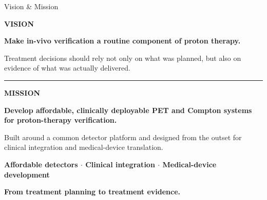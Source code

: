 \documentclass[aspectratio=169,11pt]{beamer}
\begin{document}
\begin{frame}{Vision \& Mission}

\vspace{0.15cm}


{\large\bfseries\color{PTblue}
VISION
}

\vspace{0.10cm}

{\LARGE\bfseries
Make in-vivo verification a routine component of proton therapy.
}

\vspace{0.18cm}

{\small\color{gray!70!black}
Treatment decisions should rely not only on what was planned,
but also on evidence of what was actually delivered.
}

\vspace{0.35cm}

{\color{gray!30}\rule{\textwidth}{0.5pt}}

\vspace{0.28cm}


{\large\bfseries\color{darkred}
MISSION
}

\vspace{0.10cm}

{\Large\bfseries
Develop affordable, clinically deployable PET and Compton systems
for proton-therapy verification.
}

\vspace{0.18cm}

{\small\color{gray!70!black}
Built around a common detector platform and designed from the outset
for clinical integration and medical-device translation.
}

\vfill


\begin{center}
{\scriptsize\bfseries\color{PTblue}
Affordable detectors
\quad $\cdot$ \quad
Clinical integration
\quad $\cdot$ \quad
Medical-device development
}
\end{center}

\vspace{0.08cm}

\begin{center}
{\small\bfseries\color{darkred}
From treatment planning to treatment evidence.
}
\end{center}

\end{frame}
\end{document}
